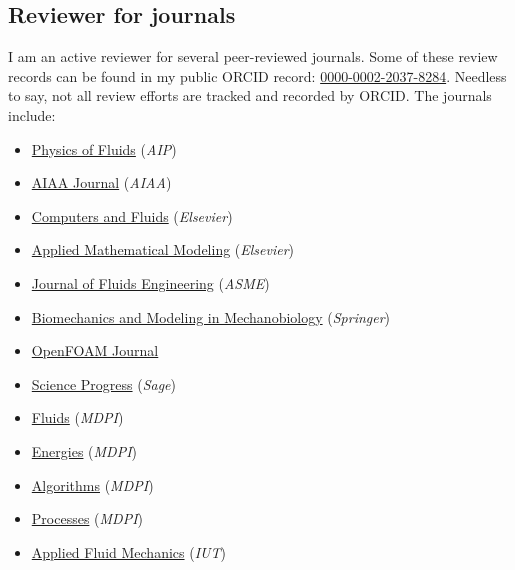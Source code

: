 \subsection{Reviewer for journals}{}
I am an active reviewer for several peer-reviewed journals. Some of these review records can be found in my public ORCID record: \href{https://orcid.org/0000-0002-2037-8284}{0000-0002-2037-8284}. Needless to say, not all review efforts are tracked and recorded by ORCID. The journals include:
\begin{itemize}[itemsep=0pt]
    \item \href{https://aip.scitation.org/journal/phf}{Physics of Fluids} (\emph{AIP})
    \item \href{https://arc.aiaa.org/aiaaj/about}{AIAA Journal} (\emph{AIAA})
    \item \href{https://www.journals.elsevier.com/computers-and-fluids}{Computers and Fluids} (\emph{Elsevier})
    \item \href{https://www.journals.elsevier.com/applied-mathematical-modelling}{Applied Mathematical Modeling} (\emph{Elsevier})
    \item \href{http://fluidsengineering.asmedigitalcollection.asme.org/journal.aspx}{Journal of Fluids Engineering} (\emph{ASME})
    \item \href{https://www.springer.com/journal/10237}{Biomechanics and Modeling in Mechanobiology} (\emph{Springer})
    \item \href{https://journal.openfoam.com/index.php/ofj}{OpenFOAM Journal}
    \item \href{https://journals.sagepub.com/home/sci}{Science Progress} (\emph{Sage})
    \item \href{https://www.mdpi.com/journal/fluids}{Fluids} (\emph{MDPI})
    \item \href{https://www.mdpi.com/journal/energies}{Energies} (\emph{MDPI})
    \item \href{https://www.mdpi.com/journal/algorithms}{Algorithms} (\emph{MDPI})
    \item \href{https://www.mdpi.com/journal/processes}{Processes} (\emph{MDPI})
    \item \href{http://jafmonline.net}{Applied Fluid Mechanics} (\emph{IUT})	
\end{itemize}
